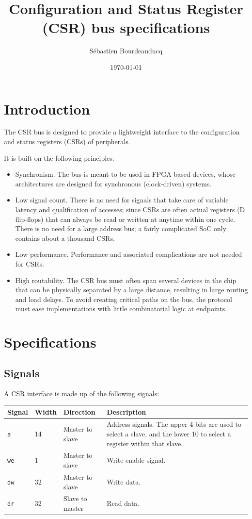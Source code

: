 \documentclass[a4paper,11pt]{article}
\title{Configuration and Status Register (CSR) bus specifications}
\author{S\'ebastien Bourdeauducq}
\date{\today}
\begin{document}
\maketitle{}
\section{Introduction}
The CSR bus is designed to provide a lightweight interface to the configuration and status registers (CSRs) of peripherals.

It is built on the following principles:
\begin{itemize}
\item Synchronism. The bus is meant to be used in FPGA-based devices, whose architectures are designed for synchronous (clock-driven) systems.
\item Low signal count. There is no need for signals that take care of variable latency and qualification of accesses; since CSRs are often actual registers (D flip-flops) that can always be read or written at anytime within one cycle. There is no need for a large address bus; a fairly complicated SoC only contains about a thousand CSRs.
\item Low performance. Performance and associated complications are not needed for CSRs.
\item High routability. The CSR bus must often span several devices in the chip that can be physically separated by a large distance, resulting in large routing and load delays. To avoid creating critical paths on the bus, the protocol must ease implementations with little combinatorial logic at endpoints.
\end{itemize}

\section{Specifications}
\subsection{Signals}
A CSR interface is made up of the following signals:

\begin{tabular}{|l|l|l|p{9cm}|}
\hline
\bf{Signal} & \bf{Width} & \bf{Direction} & \bf{Description} \\
\hline
\verb!a! & 14 & Master to slave & Address signals. The upper 4 bits are used to select a slave, and the lower 10 to select a register within that slave. \\
\hline
\verb!we! & 1 & Master to slave & Write enable signal. \\
\hline
\verb!dw! & 32 & Master to slave & Write data. \\
\hline
\verb!dr! & 32 & Slave to master & Read data. \\
\hline
\end{tabular}\\
\end{document}
